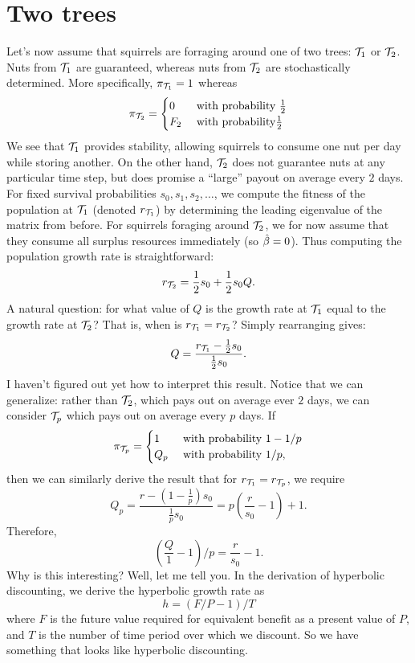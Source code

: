 \section{Two trees}
Let's now assume that squirrels are forraging around one of two
trees: $\mathcal{T}_1$ or $\mathcal{T}_2$. Nuts from $\mathcal{T}_1$ are guaranteed, whereas nuts from
$\mathcal{T}_2$ are stochastically determined. More specifically, $\pi_{\mathcal{T}_1} = 1 $ whereas 
$$ \pi_{\mathcal{T}_2} = 
\begin{cases}
    0 & \text{ with probability } \frac{1}{2} \\
    F_2 & \text{ with probability} \frac{1}{2}
\end{cases}
$$
We see that $\mathcal{T}_1$ provides stability, allowing squirrels to consume one nut per day while storing another. On the
other hand, $\mathcal{T}_2$  does not guarantee nuts 
at any particular time step, but does promise a ``large'' payout on average every $2$ days.
For fixed survival probabilities $s_0, s_1, s_2, \ldots$, we compute the fitness of the population
at $\mathcal{T}_1$  (denoted $r_{\mathcal{T}_1}$) by determining the leading eigenvalue of the matrix from before. For squirrels foraging around $\mathcal{T}_2$, 
we for now assume that they consume all surplus resources immediately (so $\hat{\beta} = 0$). Thus computing the 
population growth rate is straightforward:
$$ r_{\mathcal{T}_2} = \frac{1}{2}s_0 + \frac{1}{2}s_0 Q.$$
A natural question: for what value of $Q$ is the growth rate at $\mathcal{T}_1$ equal to the growth rate at $\mathcal{T}_2$? That is,
when is $r_{\mathcal{T}_1} = r_{\mathcal{T}_2}$? Simply rearranging gives:
$$ Q = \frac{r_{\mathcal{T}_1} - \frac{1}{2}s_0}{\frac{1}{2}s_0}.$$
I haven't figured out yet how to interpret this result. Notice that we can generalize: rather than $\mathcal{T}_2$, which pays
out on average ever $2$ days, we can consider $\mathcal{T}_p$ which pays out on average every $p$ days. If
$$ \pi_{\mathcal{T}_p} = 
\begin{cases}
    1 & \text{ with probability } 1-1/p \\
    Q_p & \text{ with probability } 1/p,
\end{cases}
$$
then we can similarly derive the result that for $r_{\mathcal{T}_1} = r_{\mathcal{T}_p}$, we require
$$ Q_p = \frac{r - (1-\frac{1}{p})s_0}{\frac{1}{p}s_0} = p\left( \frac{r}{s_0} - 1 \right) + 1.$$
Therefore, 
$$ \left( \frac{Q}{1} - 1 \right)/p = \frac{r}{s_0} - 1.$$
Why is this interesting? Well, let me tell you. In the derivation of hyperbolic discounting, 
we derive the hyperbolic growth rate as 
$$ h = \left( F/P - 1 \right)/T$$
where $F$ is the future value required for equivalent benefit as a present value of $P$, and $T$ is the number
of time period over which we discount. So we have something that looks like hyperbolic discounting.


